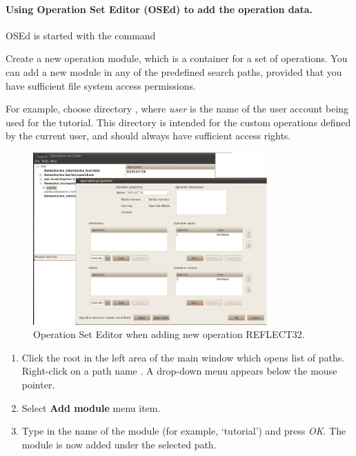 \documentclass[twoside]{tceusermanual}
\begin{document}
\paragraph{Using Operation Set Editor (OSEd) to add the operation data.}

OSEd is started with the command 


Create a new operation module, which is a container for a set of
operations.  You can add a new module in any of the predefined search
paths, provided that you have sufficient file system access
permissions.

For example, choose directory
, where \emph{user} is the
name of the user account being used for the tutorial.  This directory
is intended for the custom operations defined by the current user, and
should always have sufficient access rights.

\begin{figure}
  \begin{center} \includegraphics[width=0.8\textwidth]{eps/osed}
  \caption{Operation Set Editor when adding new operation REFLECT32.} 
  \label{fig:osed} \end{center}
\end{figure}


\begin{enumerate}
\item%
  Click the root in the left area of the main window which opens list
  of paths. Right-click on a path name
  . A drop-down menu appears
  below the mouse pointer.
\item%
  Select \textbf{Add module} menu item. 
\item%
  Type in the name of the module (for example, `tutorial') and press \emph{OK}.
  The module is now added under the selected path.
\end{enumerate} 
\end{document}
